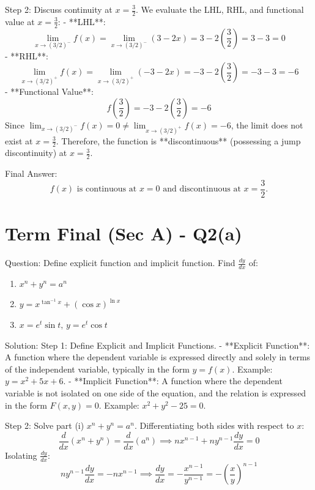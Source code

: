 \documentclass{article}
\begin{document}
Step 2: Discuss continuity at $x = \frac{3}{2}$.
We evaluate the LHL, RHL, and functional value at $x = \frac{3}{2}$:
- **LHL**:
  \[
  \lim_{x \to (3/2)^-} f(x) = \lim_{x \to (3/2)^-} (3 - 2x) = 3 - 2\left(\frac{3}{2}\right) = 3 - 3 = 0
  \]
- **RHL**:
  \[
  \lim_{x \to (3/2)^+} f(x) = \lim_{x \to (3/2)^+} (-3 - 2x) = -3 - 2\left(\frac{3}{2}\right) = -3 - 3 = -6
  \]
- **Functional Value**:
  \[
  f\left(\frac{3}{2}\right) = -3 - 2\left(\frac{3}{2}\right) = -6
  \]
Since $\lim_{x \to (3/2)^-} f(x) = 0 \ne \lim_{x \to (3/2)^+} f(x) = -6$, the limit does not exist at $x = \frac{3}{2}$. Therefore, the function is **discontinuous** (possessing a jump discontinuity) at $x = \frac{3}{2}$.

Final Answer:
\[
\boxed{f(x) \text{ is continuous at } x = 0 \text{ and discontinuous at } x = \frac{3}{2}.}
\]

\section*{Term Final (Sec A) - Q2(a)}
Question:
Define explicit function and implicit function. Find $\frac{dy}{dx}$ of:
\begin{enumerate}
    \item[(i)] $x^n + y^n = a^n$
    \item[(ii)] $y = x^{\tan^{-1} x} + (\cos x)^{\ln x}$
    \item[(iii)] $x = e^t \sin t, \, y = e^t \cos t$
\end{enumerate}

Solution:
Step 1: Define Explicit and Implicit Functions.
- **Explicit Function**: A function where the dependent variable is expressed directly and solely in terms of the independent variable, typically in the form $y = f(x)$. Example: $y = x^2 + 5x + 6$.
- **Implicit Function**: A function where the dependent variable is not isolated on one side of the equation, and the relation is expressed in the form $F(x, y) = 0$. Example: $x^2 + y^2 - 25 = 0$.

Step 2: Solve part (i) $x^n + y^n = a^n$.
Differentiating both sides with respect to $x$:
\[
\frac{d}{dx}(x^n + y^n) = \frac{d}{dx}(a^n) \implies n x^{n-1} + n y^{n-1} \frac{dy}{dx} = 0
\]
Isolating $\frac{dy}{dx}$:
\[
n y^{n-1} \frac{dy}{dx} = -n x^{n-1} \implies \frac{dy}{dx} = -\frac{x^{n-1}}{y^{n-1}} = -\left(\frac{x}{y}\right)^{n-1}
\]
\end{document}
